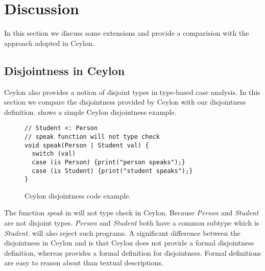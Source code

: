 \section{Discussion}
\label{sec:discussion}
In this section we discuss some extensions and provide a comparision with the approach
adopted in Ceylon.

\subsection{Disjointness in Ceylon}
\label{sec:discussion:ceylon}


 
Ceylon also provides a notion of disjoint types in type-based case analysis. In this section
we compare the disjointness provided by Ceylon with our disjointness definition.
 shows a simple Ceylon disjointness example.


\begin{figure}[t]
\begin{lstlisting}[xleftmargin=.2\textwidth, xrightmargin=.2\textwidth]
// Student <: Person
// speak function will not type check
void speak(Person | Student val) {
  switch (val)
  case (is Person) {print("person speaks");}
  case (is Student) {print("student speaks");} 
}
\end{lstlisting}
\caption{Ceylon disjointness code example.}
\label{discussion:list:ceylon}
\end{figure}

\noindent The function \emph{speak} in  
will not type check in Ceylon. Because \emph{Person} and
\emph{Student} are not disjoint types. \emph{Person} and \emph{Student} both have a common
subtype which is \emph{Student}. \cal will also reject such programs.
A significant difference between the disjointness in Ceylon and \cal is that
Ceylon does not provide
a formal disjointness definition, whereas \cal provides a formal definition for
disjointness. Formal definitions are easy to reason about than textual descriptions. 

